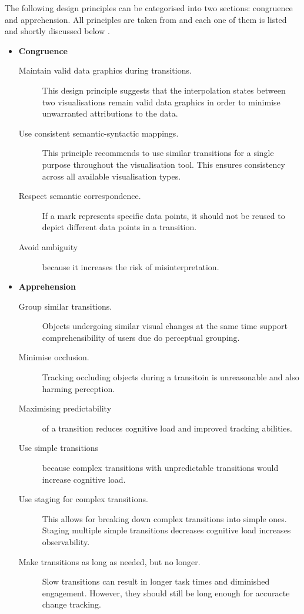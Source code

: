 The following design principles can be categorised into two sections: congruence and apprehension. All principles are taken from \citeauthor{Heer2007} and each one of them is listed and shortly discussed below .
\begin{itemize}
\item \textbf{Congruence}
\begin{description}
\item[Maintain valid data graphics during transitions.] This design principle suggests that the interpolation states between two visualisations remain valid data graphics in order to minimise unwarranted attributions to the data.
\item[Use consistent semantic-syntactic mappings.] This principle recommends to use similar transitions for a single purpose throughout the visualisation tool. This ensures consistency across all available visualisation types.
\item[Respect semantic correspondence.] If a mark represents specific data points, it should not be reused to depict different data points in a transition.
\item[Avoid ambiguity] because it increases the risk of misinterpretation.
\end{description}

\item \textbf{Apprehension}
\begin{description}
\item[Group similar transitions.] Objects undergoing similar visual changes at the same time support comprehensibility of users due do perceptual grouping.
\item[Minimise occlusion.] Tracking occluding objects during a transitoin is unreasonable and also harming perception.
\item[Maximising predictability] of a transition reduces cognitive load and improved tracking abilities.
\item[Use simple transitions] because complex transitions with unpredictable transitions would increase cognitive load.
\item[Use staging for complex transitions.] This allows for breaking down complex transitions into simple ones. Staging multiple simple transitions decreases cognitive load increases observability.
\item[Make transitions as long as needed, but no longer.] Slow transitions can result in longer task times and diminished engagement. However, they should still be long enough for accuracte change tracking.
\end{description}

\end{itemize}

